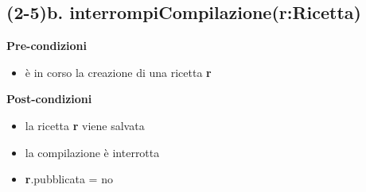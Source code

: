 \documentclass[12pt]{extarticle}
\begin{document}
\subsection*{(2-5)b. interrompiCompilazione(r:Ricetta)}

\textbf{Pre-condizioni}
\begin{itemize}
  \item è in corso la creazione di una ricetta  \textbf{r}
\end{itemize}
\textbf{Post-condizioni}
\begin{itemize}
  \item la ricetta  \textbf{r} viene salvata
  \item la compilazione è interrotta
  \item \textbf{r}.pubblicata = no
\end{itemize}
\end{document}
